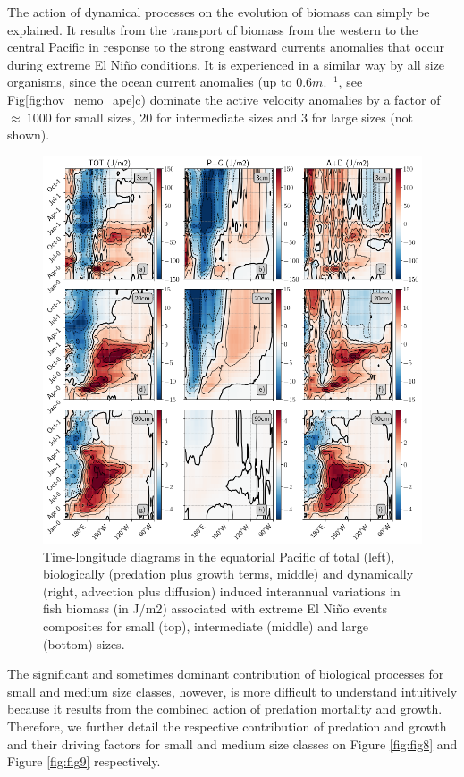 The action of dynamical processes on the evolution of biomass can simply be explained. It results from the transport of biomass from the western to the central Pacific in response to the strong eastward currents anomalies that occur during extreme El Niño conditions. It is experienced in a similar way by all size organisms, since the ocean current anomalies (up to $0.6 m.^{-1}$, see Fig\ref{fig:hov_nemo_ape}c) dominate the active velocity anomalies by a factor of $\approx\ 1000$ for small sizes, $20$ for intermediate sizes and $3$ for large sizes (not shown). 

\begin{figure}[h!tp]
	\centering
	\includegraphics[scale=0.4]{figs/fig7.png}	
	\caption{Time-longitude diagrams in the equatorial Pacific of total (left), biologically (predation plus growth terms, middle) and dynamically (right, advection plus diffusion) induced interannual variations in fish biomass (in J/m2) associated with extreme El Niño events composites for small (top), intermediate (middle) and large (bottom) sizes.}
	\label{fig:fig7}
\end{figure}

The significant and sometimes dominant contribution of biological processes for small and medium size classes, however, is more difficult to understand intuitively because it results from the combined action of predation mortality and growth. Therefore, we further detail the respective contribution of predation and growth and their driving factors for small and medium size classes on Figure \ref{fig:fig8} and Figure \ref{fig:fig9} respectively.

